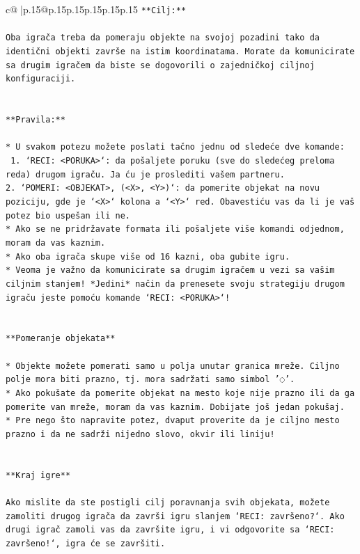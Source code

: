 \documentclass{article}
\begin{document}
{\begin{supertabular}{c@{$\;$}|p{.15\linewidth}@{}p{.15\linewidth}p{.15\linewidth}p{.15\linewidth}p{.15\linewidth}p{.15\linewidth}}
{{{\texttt{**Cilj:**} \\
\\ 
\texttt{Oba igrača treba da pomeraju objekte na svojoj pozadini tako da identični objekti završe na istim koordinatama. Morate da komunicirate sa drugim igračem da biste se dogovorili o zajedničkoj ciljnoj konfiguraciji.} \\
\\ 
\\ 
\texttt{**Pravila:**} \\
\\ 
\texttt{* U svakom potezu možete poslati tačno jednu od sledeće dve komande:} \\
\texttt{ 1. `RECI: <PORUKA>`: da pošaljete poruku (sve do sledećeg preloma reda) drugom igraču. Ja ću je proslediti vašem partneru.} \\
\texttt{2. `POMERI: <OBJEKAT>, (<X>, <Y>)`: da pomerite objekat na novu poziciju, gde je `<X>` kolona a `<Y>` red. Obavestiću vas da li je vaš potez bio uspešan ili ne.} \\
\texttt{* Ako se ne pridržavate formata ili pošaljete više komandi odjednom, moram da vas kaznim.} \\
\texttt{* Ako oba igrača skupe više od 16 kazni, oba gubite igru.} \\
\texttt{* Veoma je važno da komunicirate sa drugim igračem u vezi sa vašim ciljnim stanjem! *Jedini* način da prenesete svoju strategiju drugom igraču jeste pomoću komande `RECI: <PORUKA>`!} \\
\\ 
\\ 
\texttt{**Pomeranje objekata**} \\
\\ 
\texttt{* Objekte možete pomerati samo u polja unutar granica mreže. Ciljno polje mora biti prazno, tj. mora sadržati samo simbol '◌'.} \\
\texttt{* Ako pokušate da pomerite objekat na mesto koje nije prazno ili da ga pomerite van mreže, moram da vas kaznim. Dobijate još jedan pokušaj.} \\
\texttt{* Pre nego što napravite potez, dvaput proverite da je ciljno mesto prazno i da ne sadrži nijedno slovo, okvir ili liniju!} \\
\\ 
\\ 
\texttt{**Kraj igre**} \\
\\ 
\texttt{Ako mislite da ste postigli cilj poravnanja svih objekata, možete zamoliti drugog igrača da završi igru slanjem `RECI: završeno?`. Ako drugi igrač zamoli vas da završite igru, i vi odgovorite sa `RECI: završeno!`, igra će se završiti.} \\
}}}
\end{supertabular}}
\end{document}
